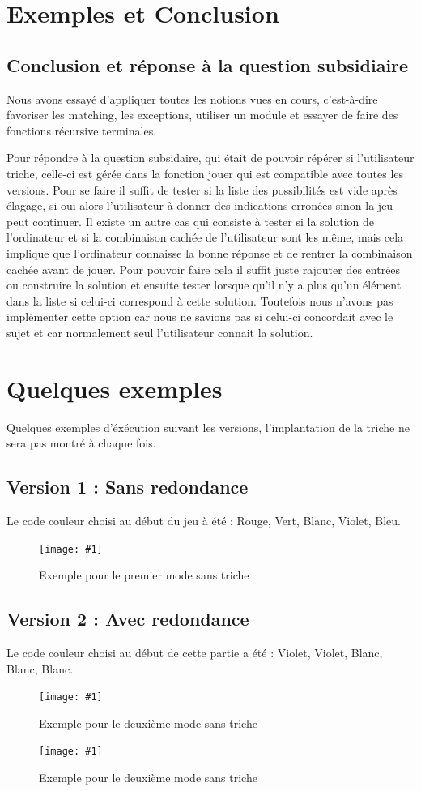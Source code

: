 \documentclass[a4paper,twoside,12pt]{report}
\newcommand{\monimage}[3]{
\par\noindent
\begin{figure}[H] %
\begin{center}
\texttt{[image: \#1]} %
\caption{#2} %
\label{#3} %
\end{center}
\end{figure} %
}
\begin{document}
\chapter{Exemples et Conclusion}
%
\section{Conclusion et réponse à la question subsidiaire}
\par Nous avons essayé d'appliquer toutes les notions vues en cours, c'est-à-dire favoriser les matching, les exceptions, utiliser un module et essayer de faire des fonctions récursive terminales.
\par Pour répondre à la question subsidaire, qui était de pouvoir répérer si l'utilisateur triche, celle-ci est gérée dans la fonction jouer qui est compatible avec toutes les versions. Pour se faire il suffit de tester si la liste des possibilités est vide après élagage, si oui alors l'utilisateur à donner des indications erronées sinon la jeu peut continuer. Il existe un autre cas qui consiste à tester si la solution de l'ordinateur et si la combinaison cachée de l'utilisateur sont les même, mais cela implique que l'ordinateur connaisse la bonne réponse et de rentrer la combinaison cachée avant de jouer. Pour pouvoir faire cela il suffit juste rajouter des entrées ou construire la solution et ensuite tester lorsque qu'il n'y a plus qu'un élément dans la liste si celui-ci correspond à cette solution. Toutefois nous n'avons pas implémenter cette option car nous ne savions pas si celui-ci concordait avec le sujet et car normalement seul l'utilisateur connait la solution.

\chapter*{Quelques exemples}
Quelques exemples d'éxécution suivant les versions, l'implantation de la triche ne sera pas montré à chaque fois.
\section*{Version 1 : Sans redondance}
Le code couleur choisi au début du jeu à été : Rouge, Vert, Blanc, Violet, Bleu.
\monimage{mode1sanstriche.png}{Exemple pour le premier mode sans triche}{M1ST}
\section*{Version 2 : Avec redondance}
Le code couleur choisi au début de cette partie a été : Violet, Violet, Blanc, Blanc, Blanc.
\monimage{mode2sanstriche_1.png}{Exemple pour le deuxième mode sans triche}{M2ST}
\monimage{mode2sanstriche_2.png}{Exemple pour le deuxième mode sans triche}{M2ST}
\end{document}
